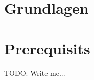 \ifisGerman
    \chapter{Grundlagen}
\else
    \chapter{Prerequisits}
\fi
\label{sec:basics}

TODO: Write me...

